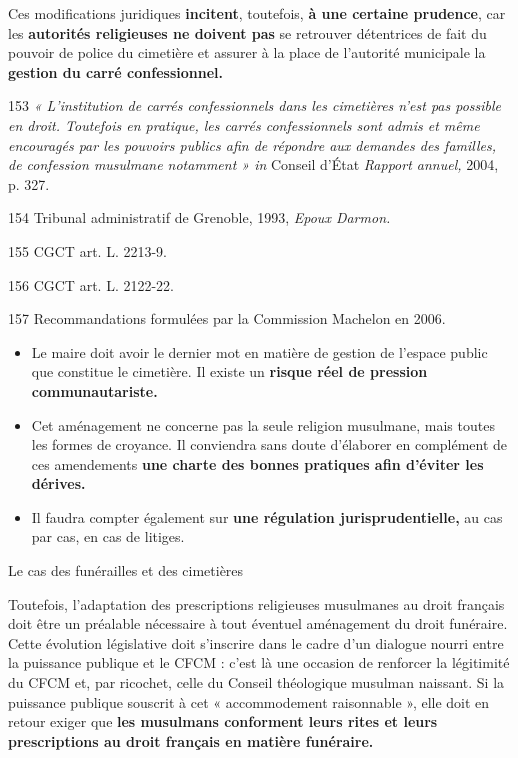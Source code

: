 Ces modifications juridiques \textbf{incitent}, toutefois, \textbf{à une
certaine prudence}, car les \textbf{autorités religieuses ne doivent
pas} se retrouver détentrices de fait du pouvoir de police du cimetière
et assurer à la place de l'autorité municipale la \textbf{gestion du
carré confessionnel.}

153 \emph{« L'institution de carrés confessionnels dans les cimetières
n'est pas possible en droit. Toutefois en pratique, les carrés
confessionnels sont admis et même encouragés par les pouvoirs publics
afin de répondre aux demandes des familles, de confession musulmane
notamment » in} Conseil d'État \emph{Rapport annuel,} 2004, p. 327.

154 Tribunal administratif de Grenoble, 1993, \emph{Epoux Darmon.}

155 CGCT art. L. 2213-9.

156 CGCT art. L. 2122-22.

157 Recommandations formulées par la Commission Machelon en 2006.




\begin{itemize}
\item
  Le maire doit avoir le dernier mot en matière de gestion de l'espace
  public que constitue le cimetière. Il existe un \textbf{risque réel de
  pression communautariste.}
\item
  Cet aménagement ne concerne pas la seule religion musulmane, mais
  toutes les formes de croyance. Il conviendra sans doute d'élaborer en
  complément de ces amendements \textbf{une charte des bonnes pratiques
  afin d'éviter les dérives.}
\item
  Il faudra compter également sur \textbf{une régulation
  jurisprudentielle,} au cas par cas, en cas de litiges.
\end{itemize}

Le cas des funérailles et des cimetières


Toutefois, l'adaptation des prescriptions religieuses musulmanes au
droit français doit être un préalable nécessaire à tout éventuel
aménagement du droit funéraire. Cette évolution législative doit
s'inscrire dans le cadre d'un dialogue nourri entre la puissance
publique et le CFCM : c'est là une occasion de renforcer la légitimité
du CFCM et, par ricochet, celle du Conseil théologique musulman
naissant. Si la puissance publique souscrit à cet « accommodement
raisonnable », elle doit en retour exiger que \textbf{les musulmans
conforment leurs rites et leurs prescriptions au droit français en
matière funéraire.}

